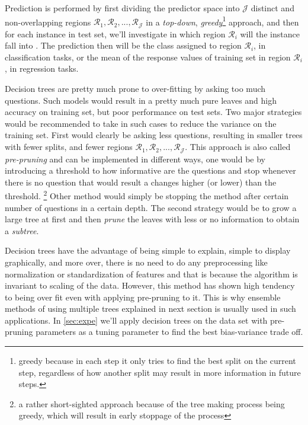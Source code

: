 \documentclass[12pt, a4paper]{scrartcl}
\begin{document}
Prediction is performed by first dividing the predictor space into $\mathcal{J}$ distinct and non-overlapping regions $\mathcal{R}_{1}, \mathcal{R}_{2},..., \mathcal{R}_{\mathcal{J}}$ in a \emph{top-down}, \emph{greedy}\footnote{greedy because in each step it only tries to find the best split on the current step, regardless of how another split may result in more information in future steps.} approach, and then for each instance in test set, we'll investigate in which region $\mathcal{R}_{i}$ will the instance fall into \citep{James:2014:ISL:2517747}. The prediction then will be the class assigned to region $\mathcal{R}_{i}$, in classification tasks, or the mean of the response values of training set in region $\mathcal{R}_{i}$, in regression tasks.

Decision trees are pretty much prone to over-fitting by asking too much questions. Such models would result in a pretty much pure leaves and high accuracy on training set, but poor performance on test sets. Two major strategies would be recommended to take in such cases to reduce the variance on the training set. First would clearly be asking less questions, resulting in smaller trees with fewer splits, and fewer regions $\mathcal{R}_{1}, \mathcal{R}_{2},..., \mathcal{R}_{\mathcal{J}}$. This approach is also called \emph{pre-pruning} and can be implemented in different ways, one would be by introducing a threshold to how informative are the questions and stop whenever there is no question that would result a changes higher (or lower) than the threshold. \footnote{a rather short-sighted approach because of the tree making process being greedy, which will result in early stoppage of the process} Other method would simply be stopping the method after certain number of questions in a certain depth. The second strategy would be to grow a large tree at first and then \emph{prune} the leaves with less or no information to obtain a \emph{subtree}. 

Decision trees have the advantage of being simple to explain, simple to display graphically, and more over, there is no need to do any preprocessing like normalization or standardization of features and that is because the algorithm is invariant to scaling of the data. However, this method has shown high tendency to being over fit even with applying pre-pruning to it. This is why ensemble methods of using multiple trees explained in next section is usually  used in such applications. In \cref{sec:expe} we'll apply decision trees on the data set with pre-pruning parameters as a tuning parameter to find the best bias-variance trade off. 
\end{document}
